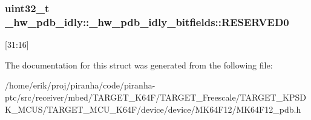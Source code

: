 \subsubsection[{\texorpdfstring{R\+E\+S\+E\+R\+V\+E\+D0}{RESERVED0}}]{\setlength{\rightskip}{0pt plus 5cm}uint32\+\_\+t \+\_\+hw\+\_\+pdb\+\_\+idly\+::\+\_\+hw\+\_\+pdb\+\_\+idly\+\_\+bitfields\+::\+R\+E\+S\+E\+R\+V\+E\+D0}\hypertarget{struct__hw__pdb__idly_1_1__hw__pdb__idly__bitfields_a1705c6e53e124d71204c521ea0337642}{}\label{struct__hw__pdb__idly_1_1__hw__pdb__idly__bitfields_a1705c6e53e124d71204c521ea0337642}
\mbox{[}31\+:16\mbox{]} 

The documentation for this struct was generated from the following file\+:\begin{DoxyCompactItemize}
\item 
/home/erik/proj/piranha/code/piranha-\/ptc/src/receiver/mbed/\+T\+A\+R\+G\+E\+T\+\_\+\+K64\+F/\+T\+A\+R\+G\+E\+T\+\_\+\+Freescale/\+T\+A\+R\+G\+E\+T\+\_\+\+K\+P\+S\+D\+K\+\_\+\+M\+C\+U\+S/\+T\+A\+R\+G\+E\+T\+\_\+\+M\+C\+U\+\_\+\+K64\+F/device/device/\+M\+K64\+F12/M\+K64\+F12\+\_\+pdb.\+h\end{DoxyCompactItemize}
